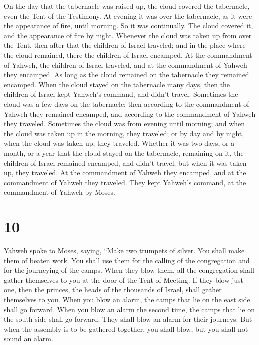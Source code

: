  On the day that the tabernacle was raised up, the cloud
covered the tabernacle, even the Tent of the Testimony. At evening it
was over the tabernacle, as it were the appearance of fire, until
morning.  So it was continually. The cloud covered it, and
the appearance of fire by night.  Whenever the cloud was
taken up from over the Tent, then after that the children of Israel
traveled; and in the place where the cloud remained, there the children
of Israel encamped.  At the commandment of Yahweh, the
children of Israel traveled, and at the commandment of Yahweh they
encamped. As long as the cloud remained on the tabernacle they remained
encamped.  When the cloud stayed on the tabernacle many
days, then the children of Israel kept Yahweh's command, and didn't
travel.  Sometimes the cloud was a few days on the
tabernacle; then according to the commandment of Yahweh they remained
encamped, and according to the commandment of Yahweh they traveled.
 Sometimes the cloud was from evening until morning; and
when the cloud was taken up in the morning, they traveled; or by day and
by night, when the cloud was taken up, they traveled. 
Whether it was two days, or a month, or a year that the cloud stayed on
the tabernacle, remaining on it, the children of Israel remained
encamped, and didn't travel; but when it was taken up, they traveled.
 At the commandment of Yahweh they encamped, and at the
commandment of Yahweh they traveled. They kept Yahweh's command, at the
commandment of Yahweh by Moses.

\hypertarget{section-9}{%
\section{10}\label{section-9}}

 Yahweh spoke to Moses, saying,  ``Make two
trumpets of silver. You shall make them of beaten work. You shall use
them for the calling of the congregation and for the journeying of the
camps.  When they blow them, all the congregation shall
gather themselves to you at the door of the Tent of Meeting.
 If they blow just one, then the princes, the heads of the
thousands of Israel, shall gather themselves to you.  When
you blow an alarm, the camps that lie on the east side shall go forward.
 When you blow an alarm the second time, the camps that lie
on the south side shall go forward. They shall blow an alarm for their
journeys.  But when the assembly is to be gathered together,
you shall blow, but you shall not sound an alarm.

